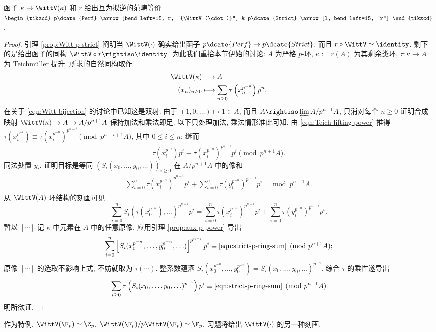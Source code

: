 \begin{theorem}\label{prop:Witt-vs-strict}
	函子 $\kappa \mapsto \WittV(\kappa)$ 和 $r$ 给出互为拟逆的范畴等价
	$\begin{tikzcd}
		p\dcate{Perf} \arrow[bend left=15, r, "{\WittV(\cdot)}"] & p\dcate{Strict} \arrow[l, bend left=15, "r"]
	\end{tikzcd}$.
\end{theorem}
\begin{proof}
	引理 \ref{prop:Witt-p-strict} 阐明当 $\WittV(\cdot)$ 确实给出函子 $p\dcate{Perf} \to p\dcate{Strict}$, 而且 $r \circ \WittV \simeq \identity$. 剩下的是给出函子的同构 $\WittV \circ r \rightiso \identity$. 为此我们重拾本节伊始的讨论: $A$ 为严格 $p$-环, $\kappa := r(A)$ 为其剩余类环, $\tau: \kappa \to A$ 为 Teichmüller 提升. 所求的自然同构取作
	\begin{align*}
		\WittV(\kappa) & \longrightarrow A \\
		(x_n)_{n \geq 0} & \longmapsto \sum_{n \geq 0} \tau\left( x_n^{p^{-n}} \right) p^n.
	\end{align*}
	在关于 \eqref{eqn:Witt-bijection} 的讨论中已知这是双射. 由于 $(1, 0, \ldots) \mapsto 1 \in A$, 而且 $A \rightiso \varprojlim A/p^{n+1}A$, 只消对每个 $n \geq 0$ 证明合成映射 $\WittV(\kappa) \to A \to A/p^{n+1} A$ 保持加法和乘法即足. 以下只处理加法, 乘法情形准此可知. 由 \eqref{eqn:Teich-lifting-power} 推得 $\tau(x_i^{p^{-i}}) \equiv \tau(x_i^{p^{-n}})^{p^{n-i}} \pmod{p^{n-i+1}A}$, 其中 $0 \leq i \leq n$; 继而
	\[ \tau\left( x_i^{p^{-i}} \right) p^i \equiv  \tau\left( x_i^{p^{-n}} \right)^{p^{n-i}} p^i  \pmod{p^{n+1} A}. \]
	同法处置 $y_i$. 证明目标是等同 $(S_i(x_0, \ldots, y_0, \ldots))_{i \geq 0}$ 在 $A/p^{n+1} A$ 中的像和
	\begin{gather}\label{eqn:strict-p-ring-sum}
		\sum_{i=0}^n \tau\left( x_i^{p^{-n}} \right)^{p^{n-i}} p^i + \sum_{i=0}^n \tau\left( y_i^{p^{-n}} \right)^{p^{n-i}} p^i \quad \bmod p^{n+1}A.
	\end{gather}
	从 $\WittV(A)$ 环结构的刻画可见
	\[ \sum_{i=0}^n S_i\left( \tau(x_0^{p^{-n}}), \ldots \right)^{p^{n-i}} p^i = \sum_{i=0}^n \tau\left( x_i^{p^{-n}} \right)^{p^{n-i}} p^i + \sum_{i=0}^n \tau\left( y_i^{p^{-n}} \right)^{p^{n-i}} p^i. \]
	暂以 $[\cdots]$ 记 $\kappa$ 中元素在 $A$ 中的任意原像, 应用引理 \ref{prop:aux-p-power} 导出
	\[ \sum_{i=0}^n \left[ S_i(x_0^{p^{-n}}, \ldots, y_0^{p^{-n}}, \ldots) \right]^{p^{n-i}} p^i \equiv \eqref{eqn:strict-p-ring-sum} \pmod{p^{n+1}A}; \]
	原像 $[\cdots]$ 的选取不影响上式, 不妨就取为 $\tau(\cdots)$. 整系数蕴涵 $S_i(x_0^{p^{-n}}, \ldots, y_0^{p^{-n}}) = S_i(x_0, \ldots, y_0, \ldots)^{p^{-n}}$. 综合 $\tau$ 的乘性遂导出
	\[ \sum_{i \geq 0} \tau\left( S_i(x_0, \ldots, y_0, \ldots)^{p^{-i}} \right) p^i \equiv \eqref{eqn:strict-p-ring-sum} \pmod{p^{n+1}A} \]
	明所欲证.
\end{proof}
作为特例, $\WittV(\F_p) \simeq \Z_p$, $\WittV(\F_p)/p\WittV(\F_p) \simeq \F_p$. 习题将给出 $\WittV(\cdot)$ 的另一种刻画.

